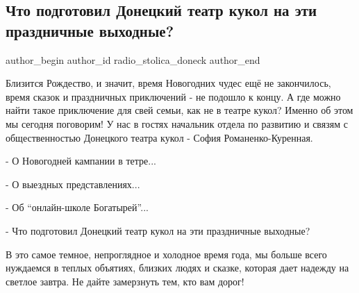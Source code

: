  
 
 
 
 
\subsection{Что подготовил Донецкий театр кукол на эти праздничные выходные?}
\label{sec:06_01_2022.vk.radio_stolica_doneck.1.teatr_kukol}

\ifcmt
 author_begin
   author_id radio_stolica_doneck
 author_end
\fi

Близится Рождество, и значит, время Новогодних чудес ещё не закончилось, время
сказок и праздничных приключений - не подошло к концу. А где можно найти такое
приключение для свей семьи, как не в театре кукол? Именно об этом мы сегодня
поговорим! У нас в гостях начальник отдела по развитию и связям с
общественностью Донецкого театра кукол - София Романенко-Куренная.


- О Новогодней кампании в тетре...

- О выездных представлениях...

- Об \enquote{онлайн-школе Богатырей}...

- Что подготовил Донецкий театр кукол на эти праздничные выходные?

В это самое темное, непроглядное и холодное время года, мы больше всего
нуждаемся в теплых объятиях, близких людях и сказке, которая дает надежду на
светлое завтра. Не дайте замерзнуть тем, кто вам дорог!
